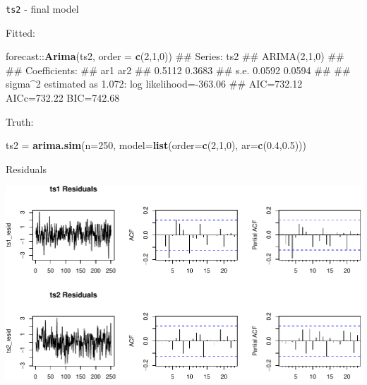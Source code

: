 \documentclass[11pt,ignorenonframetext,]{beamer}
\newenvironment{Shaded}{}{}
\newcommand{\DataTypeTok}[1]{\textcolor[rgb]{0.56,0.13,0.00}{#1}}
\newcommand{\DecValTok}[1]{\textcolor[rgb]{0.25,0.63,0.44}{#1}}
\newcommand{\FloatTok}[1]{\textcolor[rgb]{0.25,0.63,0.44}{#1}}
\newcommand{\KeywordTok}[1]{\textcolor[rgb]{0.00,0.44,0.13}{\textbf{#1}}}
\newcommand{\NormalTok}[1]{#1}
\newcommand{\OperatorTok}[1]{\textcolor[rgb]{0.40,0.40,0.40}{#1}}
\newcommand{\StringTok}[1]{\textcolor[rgb]{0.25,0.44,0.63}{#1}}
\let\oldShaded\Shaded
\let\endoldShaded\endShaded
\renewenvironment{Shaded}{\footnotesize\begin{spacing}{0.9}\oldShaded}{\endoldShaded\end{spacing}}
\let\oldverbatim\verbatim
\let\endoldverbatim\endverbatim
\newcommand{\scriptoutput}{
  \renewenvironment{Shaded}{\scriptsize\begin{spacing}{0.9}\oldShaded}{\endoldShaded\end{spacing}}
  \renewenvironment{verbatim}{\scriptsize\begin{spacing}{0.9}\oldverbatim}{\endoldverbatim\end{spacing}}
}
\begin{document}
\begin{frame}[fragile,t]{%
\protect\hypertarget{ts2---final-model}{%
\texttt{ts2} - final model}}

\scriptoutput

Fitted:

\begin{Shaded}
\begin{Highlighting}[]
\NormalTok{forecast}\OperatorTok{::}\KeywordTok{Arima}\NormalTok{(ts2, }\DataTypeTok{order =} \KeywordTok{c}\NormalTok{(}\DecValTok{2}\NormalTok{,}\DecValTok{1}\NormalTok{,}\DecValTok{0}\NormalTok{))}
\NormalTok{## Series: ts2 }
\NormalTok{## ARIMA(2,1,0) }
\NormalTok{## }
\NormalTok{## Coefficients:}
\NormalTok{##          ar1     ar2}
\NormalTok{##       0.5112  0.3683}
\NormalTok{## s.e.  0.0592  0.0594}
\NormalTok{## }
\NormalTok{## sigma^2 estimated as 1.072:  log likelihood=-363.06}
\NormalTok{## AIC=732.12   AICc=732.22   BIC=742.68}
\end{Highlighting}
\end{Shaded}

Truth:

\begin{Shaded}
\begin{Highlighting}[]
\NormalTok{ts2 =}\StringTok{ }\KeywordTok{arima.sim}\NormalTok{(}\DataTypeTok{n=}\DecValTok{250}\NormalTok{, }\DataTypeTok{model=}\KeywordTok{list}\NormalTok{(}\DataTypeTok{order=}\KeywordTok{c}\NormalTok{(}\DecValTok{2}\NormalTok{,}\DecValTok{1}\NormalTok{,}\DecValTok{0}\NormalTok{), }\DataTypeTok{ar=}\KeywordTok{c}\NormalTok{(}\FloatTok{0.4}\NormalTok{,}\FloatTok{0.5}\NormalTok{))) }
\end{Highlighting}
\end{Shaded}

\end{frame}

\begin{frame}{%
\protect\hypertarget{residuals}{%
Residuals}}

\begin{center}\includegraphics[width=\textwidth]{Lec09_files/figure-beamer/unnamed-chunk-19-1} \end{center}

\end{frame}
\end{document}
